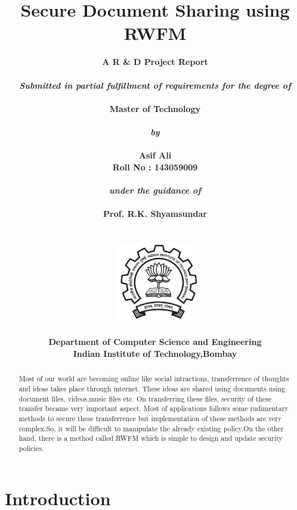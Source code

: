 \documentclass[a4paper,10pt]{report}
\title{\textbf{Secure Document Sharing using RWFM}}
\author{\bf{A R \& D Project Report}\\
		\\
		\emph{Submitted in partial fulfillment of requirements for the degree of}\\
		\\
		\bf{Master of Technology}\\
		\\
		\emph{by}\\
		\\
		    \bf{Asif Ali}\\
		\bf{Roll No : 143059009}\\
		\\
		\emph{under the guidance of}\\
		\\
		\bf{Prof. R.K. Shyamsundar}\\
		\\\\\
		\includegraphics[height=3.5cm]{./images/iitb_logo}\\
		\\
		\bf{Department of Computer Science and Engineering}\\
		\bf{Indian Institute of Technology,Bombay}\\}
\date{}
\begin{document}
\maketitle
{}
\tableofcontents
\begin{abstract}
Most of our world are becoming online like social intractions, transferrence of thoughts
and ideas takes place through internet. These ideas are shared using documents using document files,
videos,music files etc. On transferring these files, security of these transfer became very
important aspect. Most of applications follows some rudimentary methods to secure these transferrence
but implementation of these methods are very complex.So, it will be difficult to manipulate
the already existing policy.On the other hand, there is a method called RWFM which is simple to design
and update security policies.
\end{abstract}
\chapter{Introduction}

\label{chapter:intro}
\end{document}
